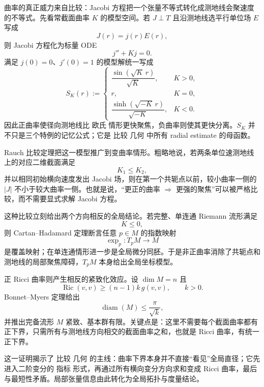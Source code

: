 曲率的真正威力来自比较：Jacobi 方程把一个张量不等式转化成测地线会聚速度的不等式。先看常截面曲率 $K$ 的模型空间。若 $J\perp T$ 且沿测地线选平行单位场 $E$ 写成
\[
J(r)=j(r)E(r),
\]
则 Jacobi 方程化为标量 ODE
\[
j''+Kj=0.
\]
满足 $j(0)=0$、$j'(0)=1$ 的模型解统一写成
\begin{equation}
S_K(r)
:=
\begin{cases}
\dfrac{\sin(\sqrt K\,r)}{\sqrt K},&K>0,\\[7pt]
r,&K=0,\\[5pt]
\dfrac{\sinh(\sqrt{-K}\,r)}{\sqrt{-K}},&K<0.
\end{cases}
\label{eq:math-dg-model-jacobi}
\end{equation}
因此正曲率使径向测地线比 欧氏 情形更快聚焦，负曲率则使其更快分离。$S_K$ 并不只是三个特例的记忆公式；它是 比较 几何 中所有 radial estimate 的母函数。

Rauch 比较定理把这一模型推广到变曲率情形。粗略地说，若两条单位速测地线上的对应二维截面满足
\[
K_1\le K_2,
\]
并以相同初始横向速度发出 Jacobi 场，则在第一个共轭点以前，较小曲率一侧的 $|J|$ 不小于较大曲率一侧。也就是说，``更正的曲率 $\Rightarrow$ 更强的聚焦''可以被严格比较，而不需要显式求解 Jacobi 方程。

这种比较立刻给出两个方向相反的全局结论。若完整、单连通 Riemann 流形满足
\[
K\le0,
\]
则 Cartan--Hadamard 定理断言任意 $p\in M$ 的指数映射
\[
\exp_p:T_pM\to M
\]
是覆盖映射；在单连通情形进一步是全局微分同胚。于是非正曲率消除了共轭点和测地线的局部聚焦障碍，$T_pM$ 本身给出全局坐标模型。

正 Ricci 曲率则产生相反的紧致化效应。设 $\dim M=n$ 且
\begin{equation*}\operatorname{Ric}(v,v)
\ge (n-1)k\,g(v,v),
\qquad k>0.\end{equation*}
Bonnet--Myers 定理给出
\begin{equation}
{
\operatorname{diam}(M)
\le\frac{\pi}{\sqrt k}
},
\label{eq:math-dg-bonnet-myers-diameter}
\end{equation}
并推出完备流形 $M$ 紧致、基本群有限。关键点是：这里不需要每个截面曲率都有正下界，只需所有与测地线方向相交的截面曲率之和，也就是 Ricci 曲率，有统一正下界。

这一证明揭示了 比较 几何 的主线：曲率下界本身并不直接``看见''全局直径；它先进入二阶变分的 指标 形式，再通过所有横向变分方向求和变成 Ricci 曲率，最后与最短性矛盾。局部张量信息由此转化为全局拓扑与度量结论。

